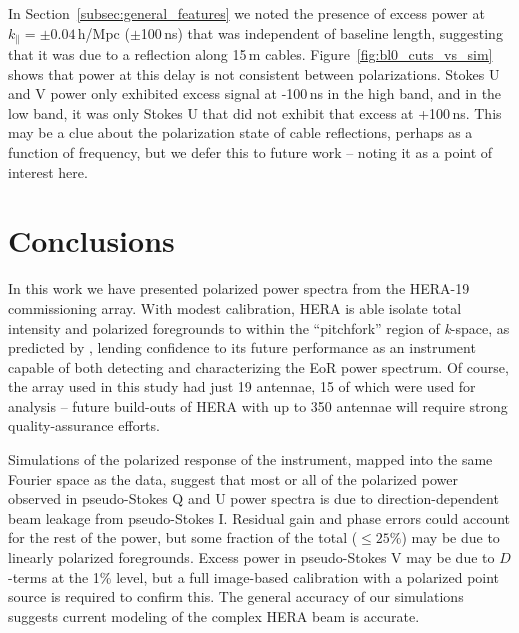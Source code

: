 \documentclass[twocolumn, trackchanges]{aastex61}
\newcommand{\edited}[1]{{\bf \color{red} #1}}
\begin{document}
In Section~\ref{subsec:general_features} we noted the presence of excess power at $k_{\parallel}=\pm 0.04$\,h/Mpc ($\pm$100\,ns) that was independent of baseline length, suggesting that it was due to a reflection along 15\,m cables. Figure~\ref{fig:bl0_cuts_vs_sim} shows that power at this delay is not consistent between polarizations. Stokes U and V power only exhibited excess signal at -100\,ns in the high band, and in the low band, it was only Stokes U that did not exhibit that excess at +100\,ns. This may be a clue about the polarization state of cable reflections, perhaps as a function of frequency, but we defer this to future work -- noting it as a point of interest here.

\edited{\section{Conclusions}}
\label{conc}

In this work we have presented polarized power spectra from the HERA-19 commissioning array. With modest calibration, HERA is able isolate total intensity and polarized foregrounds to within the ``pitchfork'' region of \textit{k}-space, as predicted by \cite{Nithya.15b}, lending confidence to its future performance as an instrument capable of both detecting and characterizing the EoR power spectrum. Of course, the array used in this study had just 19 antennae, 15 of which were used for analysis -- future build-outs of HERA with up to 350 antennae will require strong quality-assurance efforts. %

Simulations of the polarized response of the instrument, mapped into the same Fourier space as the data, suggest that most or all of the polarized power observed in pseudo-Stokes Q and U power spectra is due to direction-dependent beam leakage from pseudo-Stokes I. Residual gain and phase errors could account for the rest of the power, but some fraction of the total ($\leqslant 25\%$) may be due to linearly polarized foregrounds. Excess power in pseudo-Stokes V may be due to $D$-terms at the 1\% level, but a full image-based calibration with a polarized point source is required to confirm this. The general accuracy of our simulations suggests current modeling of the complex HERA beam is accurate.

\acknowledgements
\end{document}
